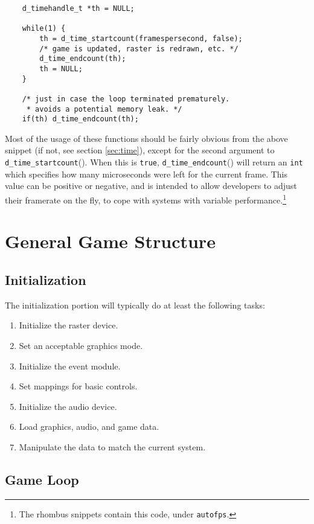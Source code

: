 \begin{verbatim}
    d_timehandle_t *th = NULL;

    while(1) {
        th = d_time_startcount(framespersecond, false);
        /* game is updated, raster is redrawn, etc. */
        d_time_endcount(th);
        th = NULL;
    }

    /* just in case the loop terminated prematurely.
     * avoids a potential memory leak. */
    if(th) d_time_endcount(th);
\end{verbatim}

Most of the usage of these functions should be fairly obvious from
the above snippet (if not, see section \ref{sec:time}), except for
the second argument to {\tt d\_time\_startcount}(). When this is
{\tt true}, {\tt d\_time\_endcount}() will return an {\tt int} which
specifies how many microseconds were left for the current frame.
This value can be positive or negative, and is intended to allow
developers to adjust their framerate on the fly, to cope with systems
with variable performance.\footnote{The rhombus snippets contain this
code, under {\tt autofps}.}

\section{General Game Structure}

\subsection{Initialization}

The initialization portion will typically do at least the
following tasks:

\begin{enumerate}
\item Initialize the raster device.
\item Set an acceptable graphics mode.
\item Initialize the event module.
\item Set mappings for basic controls.
\item Initialize the audio device.
\item Load graphics, audio, and game data.
\item Manipulate the data to match the current system.
\end{enumerate}

\subsection{Game Loop}

